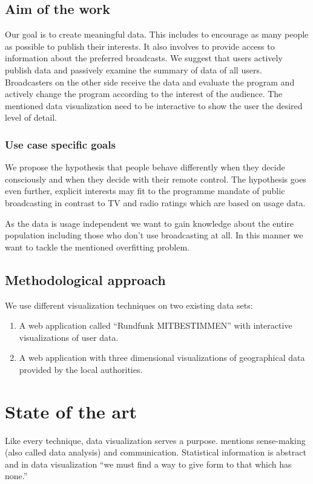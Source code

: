 \documentclass{article}
\begin{document}
\subsection{Aim of the work}
Our goal is to create meaningful data.
This includes to encourage as many people as possible to publish their interests.
It also involves to provide access to information about the preferred broadcasts.
We suggest that users actively publish data and passively examine the summary of data of all users.
Broadcasters on the other side receive the data and evaluate the program and actively change the program according to the interest of the audience.
The mentioned data visualization need to be interactive to show the user the desired level of detail.

\subsubsection{Use case specific goals}
We propose the hypothesis that people behave differently when they decide consciously and when they decide with their remote control.
The hypothesis goes even further, explicit interests may fit to the programme mandate of public broadcasting in contrast to TV and radio ratings which are based on usage data.

As the data is usage independent we want to gain knowledge about the entire population including those who don't use broadcasting at all.
In this manner we want to tackle the mentioned overfitting problem.

\subsection{Methodological approach}

We use different visualization techniques on two existing data sets:
\begin{enumerate}
  \item
    A web application called ``Rundfunk MITBESTIMMEN'' with interactive visualizations of user data.
  \item
    A web application with three dimensional visualizations of geographical data provided by the local authorities.
\end{enumerate}


\section{State of the art}
Like every technique, data visualization serves a purpose.
\textcite{Few2013} mentions sense-making (also called data analysis) and communication.
Statistical information is abstract and in data visualization ``we must find a way to give form to that which has none.''\cite{Few2013}
\end{document}
